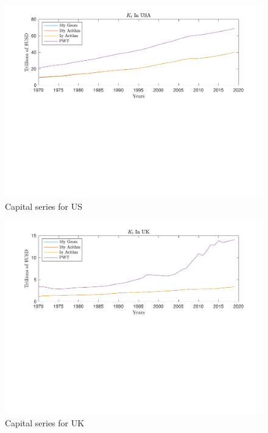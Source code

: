 \documentclass[11pt]{article}
\theoremstyle{mytheoremstyle}
\theoremstyle{mytheoremstyle}
\theoremstyle{myproblemstyle}
\begin{document}
\begin{figure}[htbp]
    \includegraphics[trim = 0in 3.2in 0in 0in, clip, width=1\textwidth]{out/Capital_Series_PWT_US.pdf}
    \caption{Capital series for US}
\end{figure}

\begin{figure}[htbp]
    \includegraphics[trim = 0in 3.2in 0in 0in, clip, width=1\textwidth]{out/Capital_Series_PWT_UK.pdf}
    \caption{Capital series for UK}
\end{figure}
\end{document}

